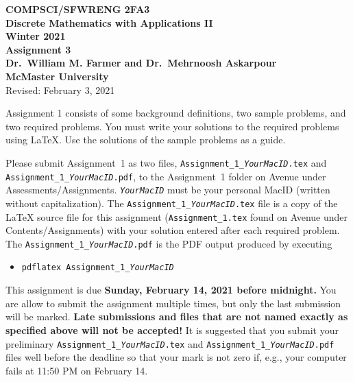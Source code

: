 \documentclass[11pt,fleqn]{article}
\begin{document}
\begin{center}
	
	{\large \textbf{COMPSCI/SFWRENG 2FA3}}\\[2mm]
	{\large \textbf{Discrete Mathematics with Applications II}}\\[2mm]
	{\large \textbf{Winter 2021}}\\[8mm]
	{\huge \textbf{Assignment 3}}\\[6mm]
	{\large \textbf{Dr.~William M. Farmer and Dr.~Mehrnoosh Askarpour}}\\[2mm]
	{\large \textbf{McMaster University}}\\[6mm]
	{\large Revised: February 3, 2021}
	
\end{center}

\medskip

Assignment 1 consists of some background definitions, two sample
problems, and two required problems.  You must write your solutions to
the required problems using LaTeX.  Use the solutions of the sample
problems as a guide.

Please submit Assignment~1 as two files,
\texttt{Assignment\_1\_\emph{YourMacID}.tex} and
\texttt{Assignment\_1\_\emph{YourMacID}.pdf}, to the Assignment~1
folder on Avenue under Assessments/Assignments.
\texttt{\emph{YourMacID}} must be your personal MacID (written without
capitalization).  The \texttt{Assignment\_1\_\emph{YourMacID}.tex}
file is a copy of the LaTeX source file for this assignment
(\texttt{Assignment\_1.tex} found on Avenue under
Contents/Assignments) with your solution entered after each required
problem.  The \texttt{Assignment\_1\_\emph{YourMacID}.pdf} is the PDF
output produced by executing

\begin{itemize}
	
	\item[] \texttt{pdflatex Assignment\_1\_\emph{YourMacID}}
	
\end{itemize}

This assignment is due \textbf{Sunday, February 14, 2021 before
	midnight.}  You are allow to submit the assignment multiple times,
but only the last submission will be marked.  \textbf{Late submissions
	and files that are not named exactly as specified above will not be
	accepted!}  It is suggested that you submit your preliminary
\texttt{Assignment\_1\_\emph{YourMacID}.tex} and
\texttt{Assignment\_1\_\emph{YourMacID}.pdf} files well before the
deadline so that your mark is not zero if, e.g., your computer fails
at 11:50 PM on February 14.
\end{document}
